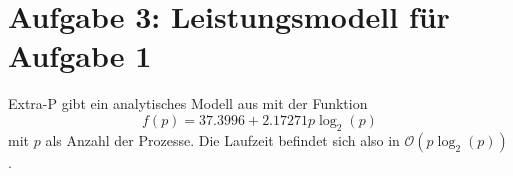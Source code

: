 \documentclass[accentcolor=tud9b]{tudreport}
\begin{document}
\chapter{Aufgabe 3: Leistungsmodell für Aufgabe 1}

Extra-P gibt ein analytisches Modell aus mit der Funktion 
\begin{equation}
 f(p) = 37.3996 + 2.17271 p \log_2 (p)
\end{equation}
mit $p$ als Anzahl der Prozesse.
Die Laufzeit befindet sich also in $\mathcal{O}(p\log_2(p))$.
\end{document}
